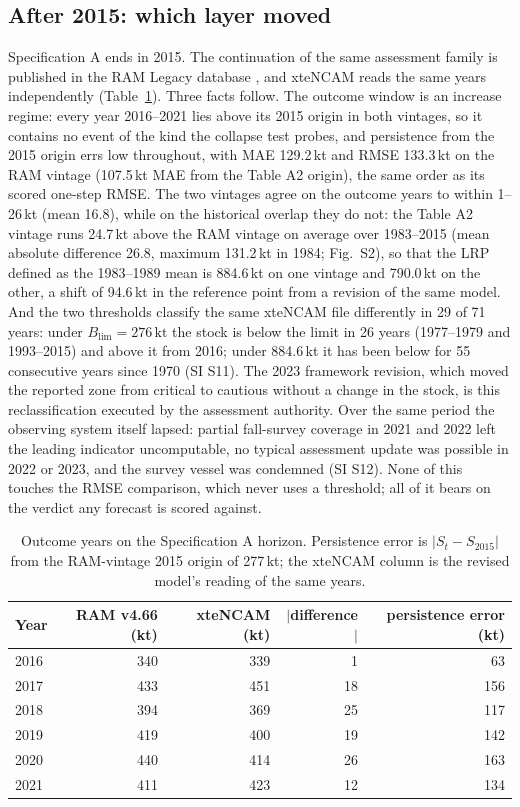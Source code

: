 \documentclass[preprint,11pt,authoryear]{elsarticle}
\theoremstyle{definition}
\theoremstyle{remark}
\newcommand{\kt}{\,\mathrm{kt}}
\newcommand{\Blim}{B_{\mathrm{lim}}}
\begin{document}
\FloatBarrier
\subsection{After 2015: which layer moved}\label{sec:verdict}

Specification A ends in 2015. The continuation of the same assessment family is published in the RAM Legacy database \citep[v4.66, stock COD2J3KL;][]{Ricard2012}, and xteNCAM reads the same years independently (Table~\ref{tab:outcome}). Three facts follow. The outcome window is an increase regime: every year 2016--2021 lies above its 2015 origin in both vintages, so it contains no event of the kind the collapse test probes, and persistence from the 2015 origin errs low throughout, with MAE 129.2\,kt and RMSE 133.3\,kt on the RAM vintage (107.5\,kt MAE from the Table A2 origin), the same order as its scored one-step RMSE. The two vintages agree on the outcome years to within 1--26\,kt (mean 16.8), while on the historical overlap they do not: the Table A2 vintage runs 24.7\,kt above the RAM vintage on average over 1983--2015 (mean absolute difference 26.8, maximum 131.2\,kt in 1984; Fig.~S2), so that the LRP defined as the 1983--1989 mean is 884.6\,kt on one vintage and 790.0\,kt on the other, a shift of 94.6\,kt in the reference point from a revision of the same model. And the two thresholds classify the same xteNCAM file differently in 29 of 71 years: under $\Blim = 276\kt$ the stock is below the limit in 26 years (1977--1979 and 1993--2015) and above it from 2016; under 884.6\,kt it has been below for 55 consecutive years since 1970 (SI S11). The 2023 framework revision, which moved the reported zone from critical to cautious without a change in the stock, is this reclassification executed by the assessment authority. Over the same period the observing system itself lapsed: partial fall-survey coverage in 2021 and 2022 left the leading indicator uncomputable, no typical assessment update was possible in 2022 or 2023, and the survey vessel was condemned (SI S12). None of this touches the RMSE comparison, which never uses a threshold; all of it bears on the verdict any forecast is scored against.

\begin{table}[!htb]
\centering\small
\caption{Outcome years on the Specification A horizon. Persistence error is $|S_t - S_{2015}|$ from the RAM-vintage 2015 origin of 277\,kt; the xteNCAM column is the revised model's reading of the same years.}
\label{tab:outcome}
\begin{tabular}{@{}lrrrr@{}}
\toprule
Year & RAM v4.66 (kt) & xteNCAM (kt) & $|$difference$|$ & persistence error (kt) \\
\midrule
2016 & 340 & 339 & 1 & 63 \\
2017 & 433 & 451 & 18 & 156 \\
2018 & 394 & 369 & 25 & 117 \\
2019 & 419 & 400 & 19 & 142 \\
2020 & 440 & 414 & 26 & 163 \\
2021 & 411 & 423 & 12 & 134 \\
\bottomrule
\end{tabular}
\end{table}
\end{document}
